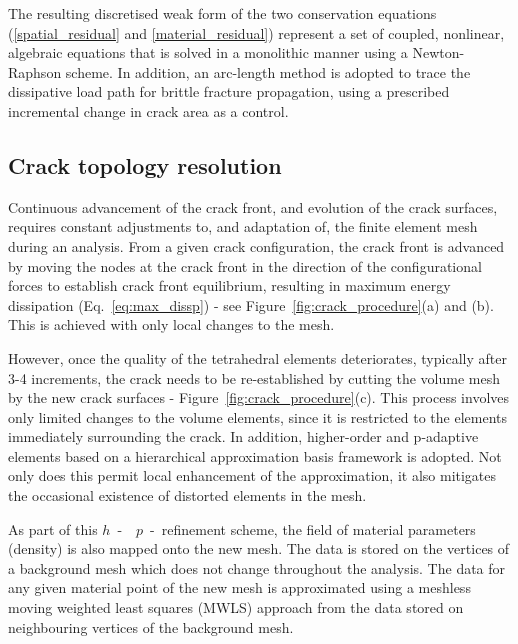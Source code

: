\documentclass[onecolumn]{svjour3}
\begin{document}
The resulting discretised weak form of the two conservation equations (\ref{spatial_residual} and \ref{material_residual}) represent a
set of coupled, nonlinear, algebraic equations that is solved in a monolithic manner using a Newton-Raphson scheme.
In addition, an arc-length method is adopted to trace the dissipative load path for brittle fracture propagation, using a prescribed incremental change in crack area as a control.

\subsection{Crack topology resolution}
\label{sec:crack_topology}
% 
Continuous advancement of the crack front, and evolution of the crack surfaces, requires constant adjustments to, and adaptation of, the finite element mesh during an analysis. 
From a given crack configuration, the crack front is advanced by moving the nodes at the crack front in the direction of the configurational forces to establish crack front equilibrium, resulting in maximum energy dissipation (Eq.~\ref{eq:max_dissp}) - see Figure~\ref{fig:crack_procedure}(a) and (b). This is achieved with only local changes to the mesh.

However, once the quality of the tetrahedral elements deteriorates, typically after 3-4 increments, the crack needs to be re-established by cutting the volume mesh by the new crack surfaces - Figure~\ref{fig:crack_procedure}(c). This process involves only limited changes to the volume elements, since it is restricted to the elements immediately surrounding the crack. In addition, higher-order and p-adaptive elements based on a hierarchical approximation basis framework \citep{mofemJoss2020,Ainsworth2003} is adopted. Not only does this permit local enhancement of the approximation, it also mitigates the occasional existence of distorted elements in the mesh. 

As part of this $h$~-~~$p$~-~refinement scheme, the field of material parameters (density) is also mapped onto the new mesh. The data is stored on the vertices of a background mesh which does not change throughout the analysis. The data for any given material point of the new mesh is approximated using a meshless moving weighted least squares (MWLS) approach from the data stored on neighbouring vertices of the background mesh. 
\end{document}

